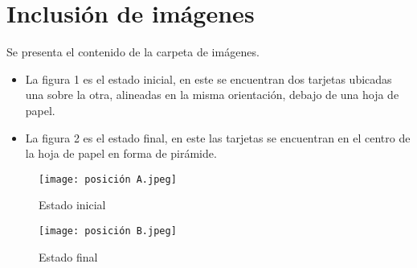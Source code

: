 \documentclass{article}
\begin{document}
\newpage

\section{Inclusión de imágenes} \label{imagenes}
Se presenta el contenido de la carpeta de imágenes.
\begin{itemize}
\item La figura 1 es el estado inicial, en este se encuentran dos tarjetas ubicadas una sobre la otra, alineadas en la misma orientación, debajo de una hoja de papel. 
\item La figura 2 es el estado final, en este las tarjetas se encuentran en el centro de la hoja de papel en forma de pirámide.

\end{itemize}

\begin{figure}[h]
\texttt{[image: posición A.jpeg]}
\centering
\caption{Estado inicial}
\label{fig:posición A}

\vspace*{1cm}

\texttt{[image: posición B.jpeg]}
\centering
\caption{Estado final}
\label{fig:posición B}

\end{figure}
\end{document}
